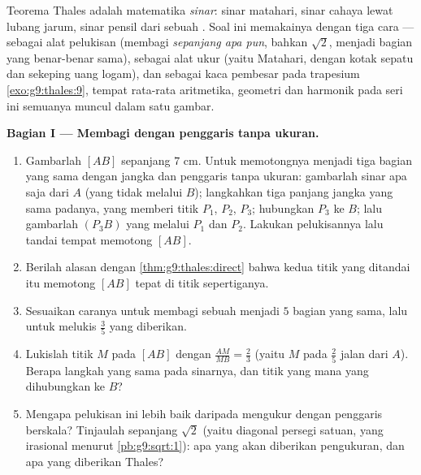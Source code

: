 \begin{problem}
\label{pb:g9:thales:1}
Teorema Thales adalah matematika \emph{sinar}: sinar matahari,
sinar cahaya lewat lubang jarum, sinar pensil dari sebuah .
Soal ini memakainya dengan tiga cara --- sebagai alat pelukisan
(membagi  \emph{sepanjang apa pun}, bahkan $\sqrt2$,
menjadi bagian yang benar-benar sama), sebagai alat ukur (yaitu 
Matahari, dengan kotak sepatu dan sekeping uang logam), dan sebagai
kaca pembesar pada trapesium
\cref{exo:g9:thales:9}, tempat rata-rata aritmetika, geometri dan
harmonik pada seri ini semuanya muncul dalam satu gambar.

\medskip
\noindent\textbf{Bagian I --- Membagi dengan penggaris tanpa ukuran.}
\begin{enumerate}
  \item Gambarlah  $[AB]$ sepanjang $7$ cm. Untuk
        memotongnya menjadi tiga bagian yang sama dengan jangka dan
        penggaris tanpa ukuran: gambarlah sinar apa saja dari $A$
        (yang tidak melalui $B$); langkahkan tiga panjang jangka yang
        sama padanya, yang memberi titik $P_1$, $P_2$, $P_3$;
        hubungkan $P_3$ ke $B$; lalu gambarlah 
        $(P_3 B)$ yang melalui $P_1$ dan $P_2$. Lakukan pelukisannya
        lalu tandai tempat  memotong $[AB]$.
  \item Berilah alasan dengan \cref{thm:g9:thales:direct} bahwa kedua
        titik yang ditandai itu memotong $[AB]$ tepat di titik
        sepertiganya.
  \item Sesuaikan caranya untuk membagi sebuah  menjadi $5$
        bagian yang sama, lalu untuk melukis $\frac35$  yang
        diberikan.
  \item Lukislah titik $M$ pada $[AB]$ dengan
        $\frac{AM}{MB} = \frac23$ (yaitu $M$ pada $\frac25$ jalan
        dari $A$). Berapa langkah yang sama pada sinarnya, dan
        titik yang mana yang dihubungkan ke $B$?
  \item Mengapa pelukisan ini lebih baik daripada mengukur dengan
        penggaris berskala? Tinjaulah  sepanjang $\sqrt2$
        (yaitu diagonal persegi satuan, yang irasional menurut
        \cref{pb:g9:sqrt:1}): apa yang akan diberikan pengukuran, dan
        apa yang diberikan Thales?
\end{enumerate}


\end{problem}
